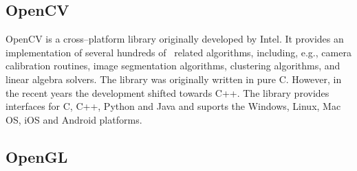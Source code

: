 
\subsection{OpenCV} 

OpenCV  is a cross--platform library originally developed by Intel. 
It provides an implementation of several hundreds of \cv\ related algorithms, 
including, e.g., camera calibration routines, image segmentation algorithms, clustering algorithms, and linear algebra solvers.
The library was originally written in pure C. 
However, in the recent years the development shifted towards C++. 
The library provides interfaces for C, C++, Python and Java and suports the Windows, Linux, Mac OS, iOS and Android platforms. 


\subsection{OpenGL} 



















